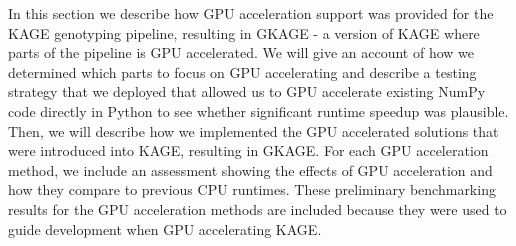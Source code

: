 In this section we describe how GPU acceleration support was provided for the KAGE genotyping pipeline, resulting in GKAGE - a version of KAGE where parts of the pipeline is GPU accelerated.
We will give an account of how we determined which parts to focus on GPU accelerating and describe a testing strategy that we deployed that allowed us to GPU accelerate existing NumPy code directly in Python to see whether significant runtime speedup was plausible.
Then, we will describe how we implemented the GPU accelerated solutions that were introduced into KAGE, resulting in GKAGE.
For each GPU acceleration method, we include an assessment showing the effects of GPU acceleration and how they compare to previous CPU runtimes.
These preliminary benchmarking results for the GPU acceleration methods are included because they were used to guide development when GPU accelerating KAGE.
